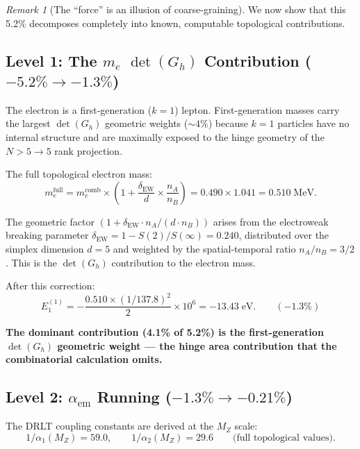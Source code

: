 \documentclass[12pt]{article}
\theoremstyle{remark}
\newtheorem{remark}[theorem]{Remark}
\theoremstyle{definition}
\begin{document}
\begin{remark}[The ``force'' is an illusion of coarse-graining]
We now show that this 5.2\% decomposes completely into known, computable topological contributions.

\subsection{Level 1: The $m_e$ $\det(G_h)$ Contribution ($-5.2\% \to -1.3\%$)}

The electron is a first-generation ($k = 1$) lepton. First-generation masses carry the largest $\det(G_h)$ geometric weights ($\sim 4\%$) because $k = 1$ particles have no internal structure and are maximally exposed to the hinge geometry of the $N > 5 \to 5$ rank projection.

The full topological electron mass:
\begin{equation}
m_e^\text{full} = m_e^\text{comb} \times \left(1 + \frac{\delta_\text{EW}}{d} \times \frac{n_A}{n_B}\right) = 0.490 \times 1.041 = 0.510\;\text{MeV}.
\end{equation}

The geometric factor $(1 + \delta_\text{EW} \cdot n_A/(d \cdot n_B))$ arises from the electroweak breaking parameter $\delta_\text{EW} = 1 - S(2)/S(\infty) = 0.240$, distributed over the simplex dimension $d = 5$ and weighted by the spatial-temporal ratio $n_A/n_B = 3/2$. This is the $\det(G_h)$ contribution to the electron mass.

After this correction:
\begin{equation}
E_1^{(1)} = -\frac{0.510 \times (1/137.8)^2}{2} \times 10^6 = -13.43\;\text{eV}. \qquad (-1.3\%)
\end{equation}

\textbf{The dominant contribution (4.1\% of 5.2\%) is the first-generation $\det(G_h)$ geometric weight --- the hinge area contribution that the combinatorial calculation omits.}

\subsection{Level 2: $\alpha_\text{em}$ Running ($-1.3\% \to -0.21\%$)}

The DRLT coupling constants are derived at the $M_Z$ scale:
\begin{equation}
1/\alpha_1(M_Z) = 59.0, \qquad 1/\alpha_2(M_Z) = 29.6 \qquad \text{(full topological values)}.
\end{equation}


\end{remark}
\end{document}

